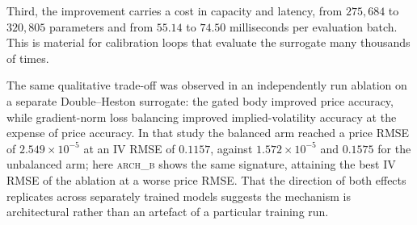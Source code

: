 Third, the improvement carries a cost in capacity and latency, from $275{,}684$
to $320{,}805$ parameters and from $55.14$ to $74.50$ milliseconds per
evaluation batch. This is material for calibration loops that evaluate the
surrogate many thousands of times.


The same qualitative trade-off was observed in an independently run ablation on
a separate Double--Heston surrogate: the gated body improved price accuracy,
while gradient-norm loss balancing improved implied-volatility accuracy at the
expense of price accuracy. In that study the balanced arm reached a price RMSE
of $2.549\times10^{-5}$ at an IV RMSE of $0.1157$, against
$1.572\times10^{-5}$ and $0.1575$ for the unbalanced arm; here
\textsc{arch\_b} shows the same signature, attaining the best IV RMSE of the
ablation at a worse price RMSE. That the direction of both effects replicates
across separately trained models suggests the mechanism is architectural rather
than an artefact of a particular training run.



\caption{Relative change in price RMSE by maturity and moneyness region,
\textsc{arch\_a} against the v5 baseline on the final fidelity panel. Positive
values are improvements. The single regression, $-1.67\%$ in the $7$--$30$ day
band, is retained in the figure: the architecture concentrates its gains at
long maturities and in the wings.}

\caption{Training curves for the v5 baseline and \textsc{arch\_a}, both seeds.
The separation is established well before the L-BFGS phase and is not an
artefact of the stopping point.}

\caption{Accuracy against inference cost. \textsc{arch\_a} buys a $9.24\%$
reduction in price RMSE for roughly a $35\%$ increase in evaluation time and a
$16\%$ increase in parameter count.}

\caption{Financial validity of the surrogate. Call price against underlying
price at six maturities for the exact Double--Heston model and for the network,
on the controlled benchmark with $r=q=0$ and $K=100$. The surrogate reproduces
the exact price to within $1.4\times10^{-3}$ currency units, and across all
tested curves exhibits no violation of $\partial C/\partial S \ge 0$,
$\partial^2 C/\partial S^2 \ge 0$, $C \ge \max(S-K,0)$ or $C \le S$.}


